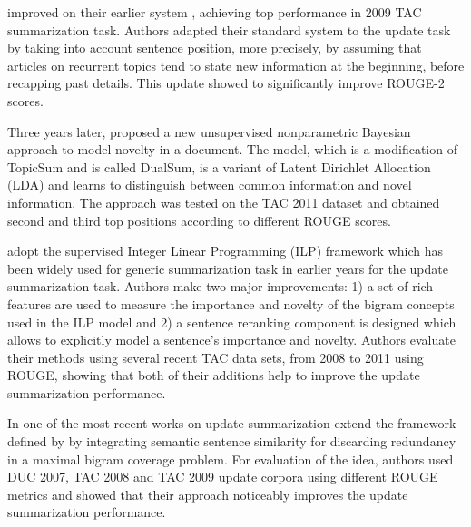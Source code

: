 \documentclass[11pt,a4paper,onecolumn]{article}
\begin{document}
\cite{gillick2009icsi} improved on their earlier system \cite{gillick2008icsi}, achieving top performance in 2009 TAC summarization task.
Authors adapted their standard system to the update task by taking into account sentence position, more precisely, by assuming that articles on recurrent topics tend to state new information at the beginning, before recapping past details.
This update showed to significantly improve ROUGE-2 scores.

Three years later, \cite{delort2012dualsum} proposed a new unsupervised nonparametric Bayesian approach to model novelty in a document.
The model, which is a modification of TopicSum and is called DualSum, is a variant of Latent Dirichlet Allocation (LDA) and learns to distinguish between common information and novel information.
The approach was tested on the TAC 2011 dataset and obtained second and third top positions according to different ROUGE scores.

\cite{li2015improving} adopt the supervised Integer Linear Programming (ILP) framework which has been widely used for generic summarization task in earlier years \cite{martins2009summarization, woodsend2012multiple} for the update summarization task.
Authors make two major improvements: 1) a set of rich features are used to measure the importance and novelty of the bigram concepts used in the ILP model and 2) a sentence reranking component is designed which allows  to explicitly model a sentence’s importance and novelty.
Authors evaluate their methods using several recent TAC data sets, from 2008 to 2011 using ROUGE, showing that both of their additions help to improve the update summarization performance.

In one of the most recent works on update summarization \cite{de2017taking} extend the framework defined by \cite{gillick2009scalable} by integrating semantic sentence similarity for discarding redundancy in a maximal bigram coverage problem.
For evaluation of the idea, authors used DUC 2007, TAC 2008 and TAC 2009 update corpora using different ROUGE metrics and showed that their approach noticeably improves the update summarization performance.
\end{document}
